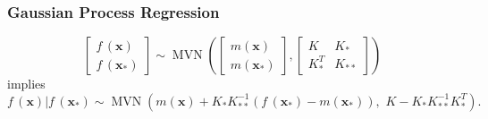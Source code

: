 \documentclass{beamer}
\DeclareMathOperator{\MVN}{MVN}
\begin{document}
\begin{frame}
    \frametitle{Gaussian Process Regression}

    $$
        \begin{bmatrix}
            f\,(\mathbf{x}) \\
            f\,(\mathbf{x}_*)
        \end{bmatrix} \sim \MVN\left(
        \begin{bmatrix}
                m(\mathbf{x}) \\
                m(\mathbf{x}_*)
            \end{bmatrix}, \begin{bmatrix}
                K       & K_{*}  \\
                K_{*}^T & K_{**}
            \end{bmatrix}
        \right)
    $$ implies
    $$
        f\,(\mathbf{x}) | f\,(\mathbf{x}_*)
        \sim \MVN\left(
        m(\mathbf{x}) + K_{*}K_{**}^{-1}(f\,(\mathbf{x}_*) - m(\mathbf{x}_*)), \,\,
        K - K_{*}K_{**}^{-1}K_{*}^T
        \right).
    $$
\end{frame}


\end{document}
